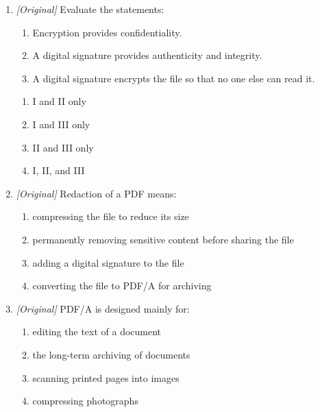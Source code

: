 \documentclass[11pt]{article}
\begin{document}
\begin{enumerate}[label=\textbf{Q\arabic*.}, leftmargin=*]
  correct?
  \begin{enumerate}[label=\Alph*.]
    \item It encrypts the file so only the signer can open it.
    \item It verifies the signer and detects any change made after signing.
    \item It converts a scanned PDF into a text PDF.
    \item It permanently removes sensitive content from the file.
  \end{enumerate}
\item \textit{[Original]} Evaluate the statements:
  \begin{enumerate}[label=\Roman*.]
    \item Encryption provides confidentiality.
    \item A digital signature provides authenticity and integrity.
    \item A digital signature encrypts the file so that no one else can read
      it.
  \end{enumerate}
  \begin{enumerate}[label=\Alph*.]
    \item I and II only
    \item I and III only
    \item II and III only
    \item I, II, and III
  \end{enumerate}
\item \textit{[Original]} Redaction of a PDF means:
  \begin{enumerate}[label=\Alph*.]
    \item compressing the file to reduce its size
    \item permanently removing sensitive content before sharing the file
    \item adding a digital signature to the file
    \item converting the file to PDF/A for archiving
  \end{enumerate}
\item \textit{[Original]} PDF/A is designed mainly for:
  \begin{enumerate}[label=\Alph*.]
    \item editing the text of a document
    \item the long-term archiving of documents
    \item scanning printed pages into images
    \item compressing photographs

\end{enumerate}
\end{enumerate}
\end{document}
